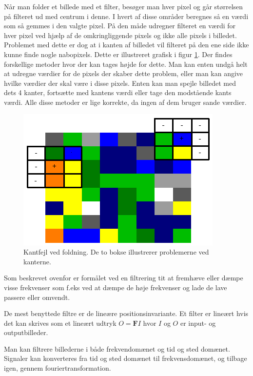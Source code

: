 Når man folder et billede med et filter, besøger man hver pixel og går størrelsen på filteret ud med centrum i denne. I hvert af disse områder beregnes så en værdi som så gemmes i den valgte pixel. På den måde udregner filteret en værdi for hver pixel ved hjælp af de omkringliggende pixels og ikke alle pixels i billedet. Problemet med dette er dog at i kanten af billedet vil filteret på den ene side ikke kunne finde nogle nabopixels. Dette er illustreret grafisk i figur \ref{fig:bildbeh_conv_edge_error}. Der findes forskellige metoder hvor der kan tages højde for dette. Man kan enten undgå helt at udregne værdier for de pixels der skaber dette problem, eller man kan angive hvilke værdier der skal være i disse pixels. Enten kan man spejle billedet med dets 4 kanter, fortsætte med kantens værdi eller tage den modstående kants værdi. Alle disse metoder er lige korrekte, da ingen af dem bruger sande værdier. 

\begin{figure}[H]
	\centering
	\includegraphics[scale=0.5]{files/bildbeh/img/conv_edge_error.png}
	\caption{Kantfejl ved foldning. De to bokse illustrerer problemerne ved kanterne\cite{converr}.\label{fig:bildbeh_conv_edge_error}}
\end{figure}

Som beskrevet ovenfor er formålet ved en filtrering tit at fremhæve eller dæmpe visse frekvenser som f.eks ved at dæmpe de høje frekvenser og lade de lave passere eller omvendt. 

De mest benyttede filtre er de lineære positionsinvariante. Et filter er lineært hvis det kan skrives som et lineært udtryk $O=\mathbf{F}I$ hvor $I$ og $O$ er input- og outputbilleder. 

Man kan filtrere billederne i både frekvendomænet og tid og sted domænet. Signaler kan konverteres fra tid og sted domænet til frekvensdomænet, og tilbage igen, gennem fouriertransformation.

